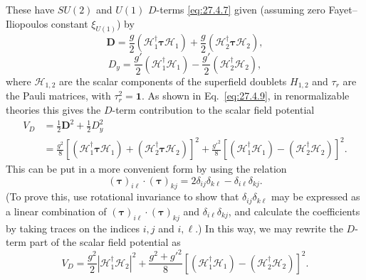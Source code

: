 These have \(SU(2)\) and \(U(1)\) \(D\)-terms \eqref{eq:27.4.7} given
(assuming zero Fayet--Iliopoulos constant \(\xi_{U(1)}\)) by
\begin{equation}
  \boldsymbol D
  =\frac{g}{2}\left(\mathcal{H}_1^\dagger\boldsymbol{\tau}\mathcal{H}_1\right)
  +\frac{g}{2}\left(\mathcal{H}_2^\dagger\boldsymbol{\tau}\mathcal{H}_2\right),
  \tag{28.5.2}\label{eq:28.5.2}
\end{equation}
\begin{equation}
  D_y
  =\frac{g'}{2}\left(\mathcal{H}_1^\dagger\mathcal{H}_1\right)
  -\frac{g'}{2}\left(\mathcal{H}_2^\dagger\mathcal{H}_2\right),
  \tag{28.5.3}\label{eq:28.5.3}
\end{equation}
where \(\mathcal{H}_{1,2}\) are the scalar components of the superfield
doublets \(H_{1,2}\) and \(\tau_r\) are the Pauli matrices, with
\(\tau_r^2=\mathbf{1}\). As shown in Eq.~\eqref{eq:27.4.9}, in
renormalizable theories this gives the \(D\)-term contribution to the
scalar field potential
\begin{equation}
  \begin{aligned}
  V_D
  &=\frac12\boldsymbol D^2+\frac12D_y^2\\
  &=\frac{g^2}{8}
    \left[
      \left(\mathcal{H}_1^\dagger\boldsymbol{\tau}\mathcal{H}_1\right)
      +\left(\mathcal{H}_2^\dagger\boldsymbol{\tau}\mathcal{H}_2\right)
    \right]^2
    +\frac{g'^2}{8}
    \left[
      \left(\mathcal{H}_1^\dagger\mathcal{H}_1\right)
      -\left(\mathcal{H}_2^\dagger\mathcal{H}_2\right)
    \right]^2 .
  \end{aligned}
  \tag{28.5.4}\label{eq:28.5.4}
\end{equation}
This can be put in a more convenient form by using the relation
\begin{equation}
  (\boldsymbol{\tau})_{i\ell}\mathbin{\cdot}
  (\boldsymbol{\tau})_{kj}
  =2\delta_{ij}\delta_{k\ell}-\delta_{i\ell}\delta_{kj}.
  \tag{28.5.5}\label{eq:28.5.5}
\end{equation}
(To prove this, use rotational invariance to show that
\(\delta_{ij}\delta_{k\ell}\) may be expressed as a linear combination of
\((\boldsymbol{\tau})_{i\ell}\mathbin{\cdot}
(\boldsymbol{\tau})_{kj}\) and \(\delta_{i\ell}\delta_{kj}\), and calculate
the coefficients by taking traces on the indices \(i,j\) and \(i,\ell\).)
In this way, we may rewrite the \(D\)-term part of the scalar field
potential as
\begin{equation}
  V_D
  =\frac{g^2}{2}\left|\mathcal{H}_1^\dagger\mathcal{H}_2\right|^2
  +\frac{g^2+g'^2}{8}
    \left[
      \left(\mathcal{H}_1^\dagger\mathcal{H}_1\right)
      -\left(\mathcal{H}_2^\dagger\mathcal{H}_2\right)
    \right]^2 .
  \tag{28.5.6}\label{eq:28.5.6}
\end{equation}

